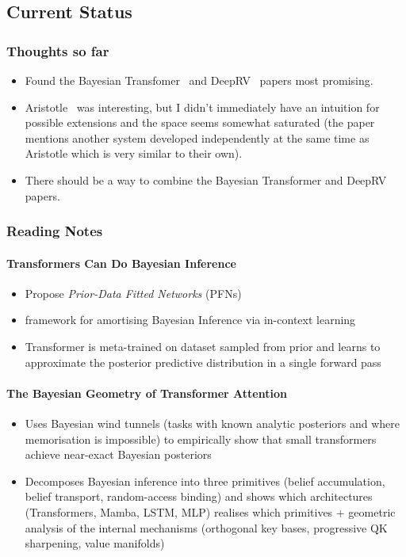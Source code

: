 \documentclass[12pt,a4paper,twoside]{article}
\begin{document}
\subsection{Current Status}
\subsubsection*{Thoughts so far}
\begin{itemize}
	\item Found the Bayesian Transfomer~\cite{Mller2022,Agarwal2026} and DeepRV~\cite{Navott2025} papers most promising.
	\item Aristotle~\cite{Achim2025} was interesting, but I didn't immediately have an intuition for possible extensions and the space seems somewhat saturated (the paper mentions another system developed independently at the same time as Aristotle which is very similar to their own).
	\item There should be a way to combine the Bayesian Transformer and DeepRV papers.
\end{itemize}

\subsubsection*{Reading Notes}
\paragraph{Transformers Can Do Bayesian Inference~\cite{Mller2022}}
\begin{itemize}
	\item Propose \textit{Prior-Data Fitted Networks} (PFNs)
	\item[$\rightarrow$] framework for amortising Bayesian Inference via in-context learning
	\item[$\rightarrow$] Transformer is meta-trained on dataset sampled from prior and learns to approximate the posterior predictive distribution in a single forward pass
\end{itemize}

\paragraph{The Bayesian Geometry of Transformer Attention~\cite{Agarwal2026}}
\begin{itemize}
	\item Uses Bayesian wind tunnels (tasks with known analytic posteriors and where memorisation is impossible) to empirically show that small transformers achieve near-exact Bayesian posteriors
	\item Decomposes Bayesian inference into three primitives (belief accumulation, belief transport, random-access binding) and shows which architectures (Transformers, Mamba, LSTM, MLP) realises which primitives + geometric analysis of the internal mechanisms (orthogonal key bases, progressive QK sharpening, value manifolds)
\end{itemize}
\end{document}
